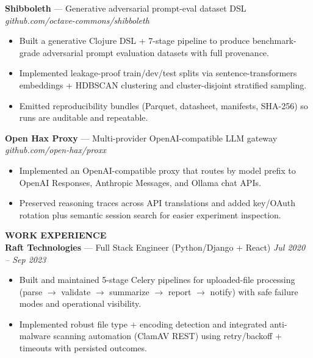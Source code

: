 \documentclass[10pt]{article}
\begin{document}
\textbf{Shibboleth} --- Generative adversarial prompt-eval dataset DSL \hfill \textit{github.com/octave-commons/shibboleth}\\
\vspace{-6pt}
\begin{itemize}
  \setlength\itemsep{-2pt}
  \setlength\parskip{0pt}
  \setlength\parsep{0pt}
  \item Built a generative Clojure DSL + 7-stage pipeline to produce benchmark-grade adversarial prompt evaluation datasets with full provenance.
  \item Implemented leakage-proof train/dev/test splits via sentence-transformers embeddings + HDBSCAN clustering and cluster-disjoint stratified sampling.
  \item Emitted reproducibility bundles (Parquet, datasheet, manifests, SHA-256) so runs are auditable and repeatable.
\end{itemize}

\textbf{Open Hax Proxy} --- Multi-provider OpenAI-compatible LLM gateway \hfill \textit{github.com/open-hax/proxx}\\
\vspace{-6pt}
\begin{itemize}
  \setlength\itemsep{-2pt}
  \setlength\parskip{0pt}
  \setlength\parsep{0pt}
  \item Implemented an OpenAI-compatible proxy that routes by model prefix to OpenAI Responses, Anthropic Messages, and Ollama chat APIs.
  \item Preserved reasoning traces across API translations and added key/OAuth rotation plus semantic session search for easier experiment inspection.
\end{itemize}

\vspace{4pt}
\textbf{WORK EXPERIENCE}\\

\textbf{Raft Technologies} --- Full Stack Engineer (Python/Django + React) \hfill \textit{Jul 2020 -- Sep 2023}\\
\vspace{-6pt}
\begin{itemize}
  \setlength\itemsep{-2pt}
  \setlength\parskip{0pt}
  \setlength\parsep{0pt}
  \item Built and maintained 5-stage Celery pipelines for uploaded-file processing (parse $\rightarrow$ validate $\rightarrow$ summarize $\rightarrow$ report $\rightarrow$ notify) with safe failure modes and operational visibility.
  \item Implemented robust file type + encoding detection and integrated anti-malware scanning automation (ClamAV REST) using retry/backoff + timeouts with persisted outcomes.
\end{itemize}
\end{document}

